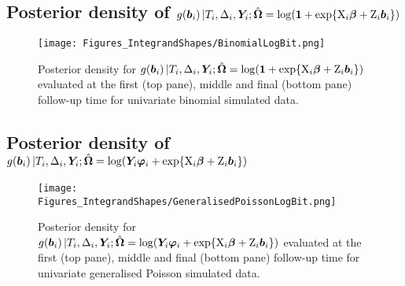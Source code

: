\clearpage
\subsection{Posterior density of \texorpdfstring{$g\!\left(\bm{b}_i\right)|T_i,\Delta_i,\bm{Y}_i;\hat{\bm{\Omega}}=\log\!\left(\bm{1}+\exp\!\left\{\mathrm{X}_i\bm{\beta}+\mathrm{Z}_i\bm{b}_i\right\}\right)$}{binomial}}\label{sec:appendix-suppfigs-justification-binomallogbit}
\begin{figure}[ht]
  \centering
  \texttt{[image: Figures\_IntegrandShapes/BinomialLogBit.png]}
  \caption{Posterior density for $g\!\left(\bm{b}_i\right)|T_i,\Delta_i,\bm{Y}_i;\hat{\bm{\Omega}}=\log\!\left(\bm{1}+\exp\!\left\{\mathrm{X}_i\bm{\beta}+\mathrm{Z}_i\bm{b}_i\right\}\right)$ evaluated at the first (top pane), middle and final (bottom pane) follow-up time for univariate binomial simulated data.}
  \label{fig:appendix-justification-integrands-binquantity}
\end{figure}
\clearpage
\subsection{Posterior density of \texorpdfstring{$g\!\left(\bm{b}_i\right)|T_i,\Delta_i,\bm{Y}_i;\hat{\bm{\Omega}}=\log\!\left(\bm{Y}_i\bm{\varphi}_i+\exp\!\left\{\mathrm{X}_i\bm{\beta}+\mathrm{Z}_i\bm{b}_i\right\}\right)$}{genpois}}\label{sec:appendix-suppfigs-justification-GP1logbit}
\begin{figure}[ht]
  \centering
  \texttt{[image: Figures\_IntegrandShapes/GeneralisedPoissonLogBit.png]}
  \caption{Posterior density for $g\!\left(\bm{b}_i\right)|T_i,\Delta_i,\bm{Y}_i;\hat{\bm{\Omega}}=\log\!\left(\bm{Y}_i\bm{\varphi}_i+\exp\!\left\{\mathrm{X}_i\bm{\beta}+\mathrm{Z}_i\bm{b}_i\right\}\right)$ evaluated at the first (top pane), middle and final (bottom pane) follow-up time for univariate generalised Poisson simulated data.}
  \label{fig:appendix-justification-integrands-GP1quantity}
\end{figure}
\clearpage

